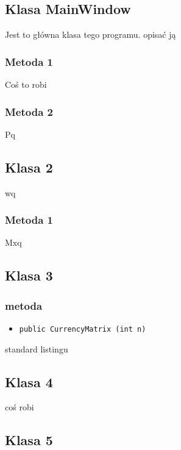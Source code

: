 \documentclass[a4paper,11pt]{article}
\newcommand\tab[1][0.6cm]{\hspace*{#1}}
\begin{document}
\subsection{Klasa MainWindow}

\tab Jest to główna klasa tego programu. opisać ją

\subsubsection{Metoda 1}


\tab Coś to robi

\subsubsection{Metoda 2}


\tab Pq

\subsection{Klasa 2}

\tab wq

\subsubsection{Metoda 1}


\tab Mxq


\subsection{Klasa 3}
\tab 

\subsubsection{metoda}
\begin{itemize}
\item \begin{lstlisting}
public CurrencyMatrix (int n)
\end{lstlisting}
\end{itemize}

\tab standard listingu

\subsection{Klasa 4}

\tab coś robi


\subsection{Klasa 5}
\end{document}
